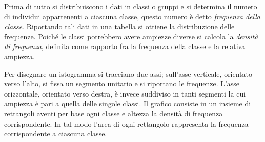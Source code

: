Prima di tutto si distribuiscono i dati in classi o gruppi e si determina il numero di individui appartenenti a ciascuna classe, questo numero è
detto \emph{frequenza della classe}.
Riportando tali dati in una tabella si ottiene la distribuzione delle frequenze. Poiché le classi potrebbero avere ampiezze diverse si calcola
la \emph{densità di frequenza}, definita come rapporto fra la frequenza della classe e la relativa ampiezza.

Per disegnare un istogramma si tracciano due assi; sull'asse verticale, orientato verso l'alto, si fissa un segmento unitario e si riportano
le frequenze. L'asse orizzontale, orientato verso destra, è invece suddiviso in tanti segmenti la cui ampiezza è pari a quella delle singole classi.
Il grafico consiste in un insieme di rettangoli aventi per base ogni classe e altezza la densità di frequenza corrispondente.
In tal modo l'area di ogni rettangolo rappresenta la frequenza corrispondente a ciascuna classe.

